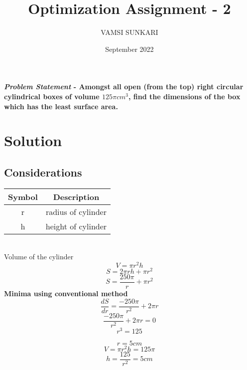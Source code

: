 \documentclass[journal,10pt,twocolumn]{article}
\title{\textbf{Optimization Assignment - 2}}
\author{VAMSI SUNKARI}
\date{September 2022}
\begin{document}
\maketitle
\paragraph{\textit{Problem Statement} - Amongst all open (from the top) right circular cylindrical boxes of volume $125\pi cm^{3}$, find the dimensions of the box which has the least surface area.}
\section*{\large Solution}
\subsection{\textbf{Considerations}}


\begin{tabular}{|c|c|}
 \hline
 \textbf{Symbol}&\textbf{Description}\\
 \hline
 r&radius of cylinder\\
 \hline
 h&height of cylinder\\
\hline
\end{tabular}\\
    Volume of the cylinder
    \begin{equation}
        V = \pi r^2 h
    \end{equation}
    \begin{equation}
        S = 2\pi rh + \pi r^2
    \end{equation}
    \begin{equation}
        S = \frac{250 \pi}{r} + \pi r^2 
    \end{equation}
    \textbf{Minima using conventional method}
    \begin{equation}
        \frac{dS}{dr} = \frac{-250 \pi}{r^2} + 2 \pi r
    \end{equation}
    \begin{equation}
        \frac{-250 \pi}{r^2} + 2 \pi r = 0
    \end{equation}
    \begin{equation}
        r^3 = 125
    \end{equation}
    
    \begin{equation}
        r = 5 cm
    \end{equation}
    \begin{equation}
	    V=\pi r^2   h=125\pi
    \end{equation}
    \begin{equation}
	    h=\frac{125}{r^2}=5 cm
    \end{equation}
	
\end{document}
